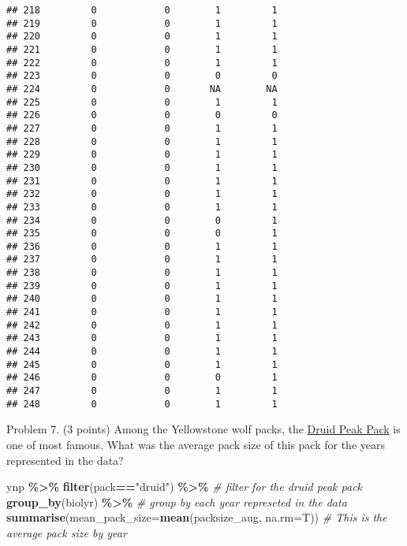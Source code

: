 \documentclass[
]{article}
\newenvironment{Shaded}{\begin{snugshade}}{\end{snugshade}}
\newcommand{\AttributeTok}[1]{\textcolor[rgb]{0.13,0.29,0.53}{#1}}
\newcommand{\CommentTok}[1]{\textcolor[rgb]{0.56,0.35,0.01}{\textit{#1}}}
\newcommand{\FunctionTok}[1]{\textcolor[rgb]{0.13,0.29,0.53}{\textbf{#1}}}
\newcommand{\NormalTok}[1]{#1}
\newcommand{\SpecialCharTok}[1]{\textcolor[rgb]{0.81,0.36,0.00}{\textbf{#1}}}
\newcommand{\StringTok}[1]{\textcolor[rgb]{0.31,0.60,0.02}{#1}}
\begin{document}
\begin{verbatim}
## 218         0            0        1         1
## 219         0            0        1         1
## 220         0            0        1         1
## 221         0            0        1         1
## 222         0            0        1         1
## 223         0            0        0         0
## 224         0            0       NA        NA
## 225         0            0        1         1
## 226         0            0        0         0
## 227         0            0        1         1
## 228         0            0        1         1
## 229         0            0        1         1
## 230         0            0        1         1
## 231         0            0        1         1
## 232         0            0        1         1
## 233         0            0        1         1
## 234         0            0        0         1
## 235         0            0        0         1
## 236         0            0        1         1
## 237         0            0        1         1
## 238         0            0        1         1
## 239         0            0        1         1
## 240         0            0        1         1
## 241         0            0        1         1
## 242         0            0        1         1
## 243         0            0        1         1
## 244         0            0        1         1
## 245         0            0        1         1
## 246         0            0        0         1
## 247         0            0        1         1
## 248         0            0        1         1
\end{verbatim}

Problem 7. (3 points) Among the Yellowstone wolf packs, the
\href{https://www.pbs.org/wnet/nature/in-the-valley-of-the-wolves-the-druid-wolf-pack-story/209/}{Druid
Peak Pack} is one of most famous. What was the average pack size of this
pack for the years represented in the data?

\begin{Shaded}
\begin{Highlighting}[]
\NormalTok{ynp }\SpecialCharTok{\%\textgreater{}\%}
  \FunctionTok{filter}\NormalTok{(pack}\SpecialCharTok{==}\StringTok{"druid"}\NormalTok{) }\SpecialCharTok{\%\textgreater{}\%} \CommentTok{\# filter for the druid peak pack}
  \FunctionTok{group\_by}\NormalTok{(biolyr) }\SpecialCharTok{\%\textgreater{}\%} \CommentTok{\# group by each year represeted in the data}
  \FunctionTok{summarise}\NormalTok{(}\AttributeTok{mean\_pack\_size=}\FunctionTok{mean}\NormalTok{(packsize\_aug, }\AttributeTok{na.rm=}\NormalTok{T)) }\CommentTok{\# This is the average pack size by year}
\end{Highlighting}
\end{Shaded}
\end{document}
